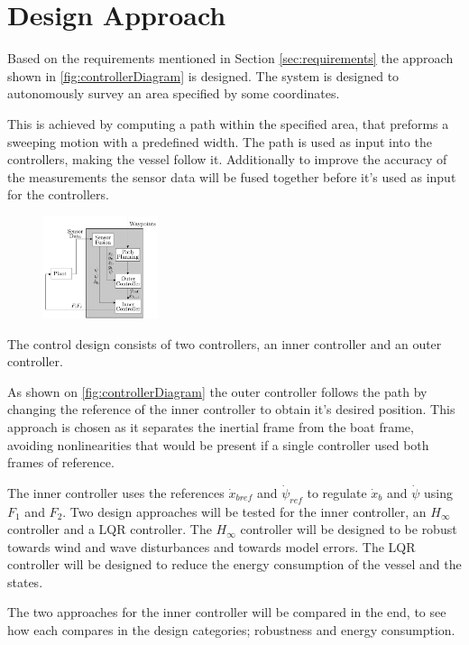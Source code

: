 \chapter{Design Approach} \label{chap:designaproach}
Based on the requirements mentioned in Section \ref{sec:requirements} the approach shown in \autoref{fig:controllerDiagram} is designed. 
The system is designed to autonomously survey an area specified by some coordinates.

This is achieved by computing a path within the specified area, that preforms a sweeping motion with a predefined width.
The path is used as input into the controllers, making the vessel follow it. 
Additionally to improve the accuracy of the measurements the sensor data will be fused together before it's used as input for the controllers. 
\begin{figure}[H]
    \includegraphics[width=0.3\textwidth]{figures/controllerDiagram2}
    \caption{}
    \label{fig:controllerDiagram}
\end{figure}

The control design consists of two controllers, an inner controller and an outer controller. 

As shown on \autoref{fig:controllerDiagram} the outer controller follows the path by changing the reference of the inner controller to obtain it's desired position. 
This approach is chosen as it separates the inertial frame from the boat frame, avoiding nonlinearities that would be present if a single controller used both frames of reference. 

The inner controller uses the references $\dot{x}_{bref}$ and $\dot{\psi}_{ref}$ to regulate $\dot{x}_{b}$ and $\dot{\psi}$ using $F_{1}$ and $F_{2}$. 
Two design approaches will be tested for the inner controller, an $H_{\infty}$ controller and a LQR controller.
The $H_{\infty}$ controller will be designed to be robust towards wind and wave disturbances and towards model errors. 
The LQR controller will be designed to reduce the energy consumption of the vessel and the states. 

The two approaches for the inner controller will be compared in the end, to see how each compares in the design categories; robustness and energy consumption. 


